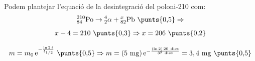 \begin{solapartat}
Podem plantejar l'equació de la desintegració del poloni-210 com:
\[ {}^{210}_{84}\mathrm{Po} \rightarrow {}^{4}_{2}\alpha + {}^{x}_{82}\mathrm{Pb} \ \text{\punts{0,5}} \Rightarrow \]
\[ x + 4 = 210 \ \text{\punts{0,3}} \Rightarrow x = 206 \ \text{\punts{0,2}} \]
\end{solapartat}

\begin{solapartat}
\[ m = m_0\,\mathrm{e}^{-\frac{\ln 2\,t}{t_{1/2}}} \ \text{\punts{0,5}} \Rightarrow m = (5\ \mathrm{mg})\,\mathrm{e}^{-\frac{(\ln 2)\,20\ \text{dies}}{37\ \text{dies}}} = 3,4\ \mathrm{mg} \ \text{\punts{0,5}} \]
\end{solapartat}
